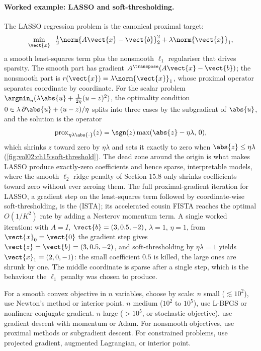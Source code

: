 \paragraph{Worked example: LASSO and soft-thresholding.}
The LASSO regression problem is the canonical proximal target:
\[
\min_{\vect{x}} \;\; \tfrac{1}{2} \norm{A \vect{x} - \vect{b}}_{2}^{2}
+ \lambda \norm{\vect{x}}_{1},
\]
a smooth least-squares term plus the nonsmooth $\ell_{1}$
regulariser that drives sparsity. The smooth part has gradient
$A^{\transpose}(A \vect{x} - \vect{b})$; the nonsmooth part is
$r(\vect{x}) = \lambda \norm{\vect{x}}_{1}$, whose proximal
operator separates coordinate by coordinate. For the scalar problem
$\argmin_{u} (\lambda \abs{u} + \tfrac{1}{2 \eta}(u - z)^{2})$, the
optimality condition $0 \in \lambda \, \partial \abs{u} +
(u - z)/\eta$ splits into three cases by the subgradient of
$\abs{u}$, and the solution is the 
operator
\[
\operatorname{prox}_{\eta \lambda \abs{\cdot}}(z) =
\sgn(z) \max(\abs{z} - \eta \lambda, \, 0),
\]
which shrinks $z$ toward zero by $\eta \lambda$ and sets it exactly
to zero when $\abs{z} \leq \eta \lambda$
(\cref{fig:vol02:ch15:soft-threshold}). The dead zone around the
origin is what makes LASSO produce exactly-zero coefficients and
hence sparse, interpretable models, where the smooth $\ell_{2}$
ridge penalty of Section 15.8 only shrinks coefficients toward zero
without ever zeroing them. The full proximal-gradient iteration for
LASSO, a gradient step on the least-squares term followed by
coordinate-wise soft-thresholding, is the  (ISTA); its accelerated cousin
FISTA reaches the optimal $O(1/K^{2})$ rate by adding a Nesterov
momentum term. A single worked iteration: with $A = I$, $\vect{b} =
(3, 0.5, -2)$, $\lambda = 1$, $\eta = 1$, from $\vect{x}_{0} =
\vect{0}$ the gradient step gives $\vect{z} = \vect{b} = (3, 0.5,
-2)$, and soft-thresholding by $\eta \lambda = 1$ yields
$\vect{x}_{1} = (2, 0, -1)$: the small coefficient $0.5$ is killed,
the large ones are shrunk by one. The middle coordinate is sparse
after a single step, which is the behaviour the $\ell_{1}$ penalty
was chosen to produce.



\begin{principle}
For a smooth convex objective in $n$ variables, choose by scale:
$n$ small ($\lesssim 10^{2}$), use Newton's method or interior
point. $n$ medium ($10^{2}$ to $10^{5}$), use L-BFGS or
nonlinear conjugate gradient. $n$ large ($> 10^{5}$, or stochastic
objective), use gradient descent with momentum or Adam. For
nonsmooth objectives, use proximal methods or subgradient
descent. For constrained problems, use projected gradient,
augmented Lagrangian, or interior point.
\end{principle}

